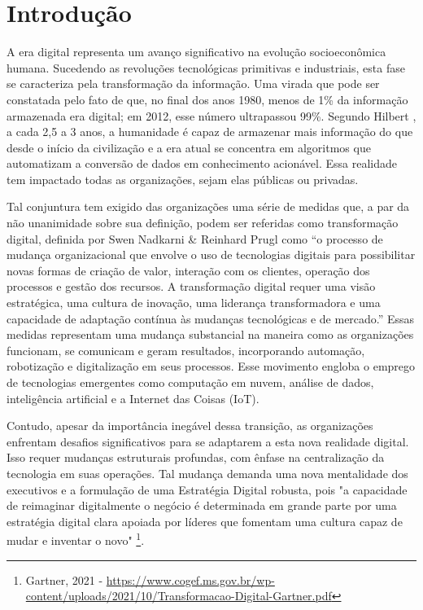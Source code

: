 \section{Introdução}

A era digital representa um avanço significativo na evolução socioeconômica humana. Sucedendo as revoluções tecnológicas primitivas e industriais, esta fase se caracteriza pela transformação da informação. Uma virada que pode ser constatada pelo fato de que, no final dos anos 1980, menos de 1\% da informação armazenada era digital; em 2012, esse número ultrapassou 99\%. Segundo Hilbert \cite{hilbert2020digital}, a cada 2,5 a 3 anos, a humanidade é capaz de armazenar mais informação do que desde o início da civilização e a era atual se concentra em algoritmos que automatizam a conversão de dados em conhecimento acionável. Essa realidade tem impactado todas as organizações, sejam elas públicas ou privadas.

Tal conjuntura tem exigido das organizações uma série de medidas que, a par da não unanimidade sobre sua definição, podem ser referidas como transformação digital, definida por Swen Nadkarni \& Reinhard Prugl \cite{nadkarni2021digital} como “o processo de mudança organizacional que envolve o uso de tecnologias digitais para possibilitar novas formas de criação de valor, interação com os clientes, operação dos processos e gestão dos recursos. A transformação digital requer uma visão estratégica, uma cultura de inovação, uma liderança transformadora e uma capacidade de adaptação contínua às mudanças tecnológicas e de mercado.” Essas medidas representam uma mudança substancial na maneira como as organizações funcionam, se comunicam e geram resultados, incorporando automação, robotização e digitalização em seus processos. Esse movimento engloba o emprego de tecnologias emergentes como computação em nuvem, análise de dados, inteligência artificial e a Internet das Coisas (IoT). 

Contudo, apesar da importância inegável dessa transição, as organizações enfrentam desafios significativos para se adaptarem a esta nova realidade digital. Isso requer mudanças estruturais profundas, com ênfase na centralização da tecnologia em suas operações. Tal mudança demanda uma nova mentalidade dos executivos e a formulação de uma Estratégia Digital robusta, pois "a capacidade de reimaginar digitalmente o negócio é determinada em grande parte por uma estratégia digital clara apoiada por líderes que fomentam uma cultura capaz de mudar e inventar o novo" \footnote{Gartner, 2021 - \url{https://www.cogef.ms.gov.br/wp-content/uploads/2021/10/Transformacao-Digital-Gartner.pdf}}.

